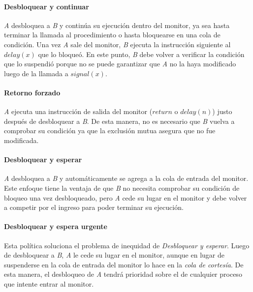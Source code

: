 \paragraph{Desbloquear y continuar}
\textit{A} desbloquea a \textit{B} y continúa su ejecución dentro del monitor,
ya sea hasta terminar la llamada al procedimiento o hasta bloquearse en una cola
de condición. Una vez \textit{A} sale del monitor, \textit{B} ejecuta la
instrucción siguiente al $delay(x)$ que lo bloqueó.
En este punto, \textit{B} debe volver a verificar la condición que lo suspendió
porque no se puede garantizar que \textit{A} no la haya modificado luego de la
llamada a $signal(x)$.

\paragraph{Retorno forzado}
\textit{A} ejecuta una instrucción de salida del monitor ($return$ o $delay(n)$)
justo después de desbloquear a \textit{B}.
De esta manera, no es necesario que \textit{B} vuelva a comprobar su condición
ya que la exclusión mutua asegura que no fue modificada.

\paragraph{Desbloquear y esperar}
\textit{A} desbloquea a \textit{B} y automáticamente se agrega a la cola de
entrada del monitor.
Este enfoque tiene la ventaja de que \textit{B} no necesita comprobar su
condición de bloqueo una vez desbloqueado, pero \textit{A} cede su lugar en el
monitor y debe volver a competir por el ingreso para poder terminar su
ejecución.

\paragraph{Desbloquear y espera urgente}
Esta política soluciona el problema de inequidad de \textit{Desbloquear y
esperar}. Luego de desbloquear a \textit{B}, \textit{A} le cede su lugar en el
monitor, aunque en lugar de suspenderse en la cola de entrada del monitor lo
hace en la \textit{cola de cortesía}. De esta manera, el desbloqueo de
\textit{A} tendrá prioridad sobre el de cualquier proceso que intente entrar al
monitor.

